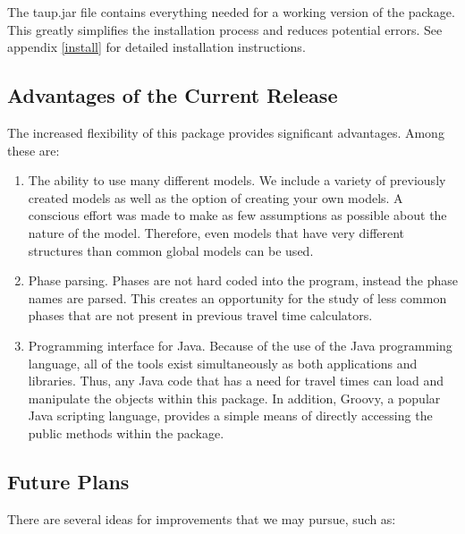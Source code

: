 The taup.jar file contains everything needed for a working version of the package.
This greatly simplifies the installation process and reduces potential errors.
See appendix \ref{install} for detailed installation instructions.

\subsection{Advantages of the Current Release}
The increased flexibility of this package provides significant advantages. Among
these are:
\begin{enumerate}
\item The ability to use many different models. We include a variety of previously created
models as well as the option of creating your own models. A conscious effort
was made to make as few assumptions as possible about the nature of the model.
Therefore,
even models that have very different structures than common global models can be
used.

\item Phase parsing. Phases are not hard coded into the program, instead the phase
names are parsed. This creates an opportunity for the study of less common
phases that are not present in previous travel time calculators.

\item Programming interface for Java. Because of the use of the Java programming
language, all of the tools exist simultaneously as both applications and libraries.
Thus, any Java code that has a need for travel times can load and manipulate
the objects within this package. In addition, Groovy, a popular Java scripting language, provides a simple means of directly accessing the public methods within the package.

\end{enumerate}


\subsection{Future Plans}

There are several ideas for improvements that we may pursue, such as:

